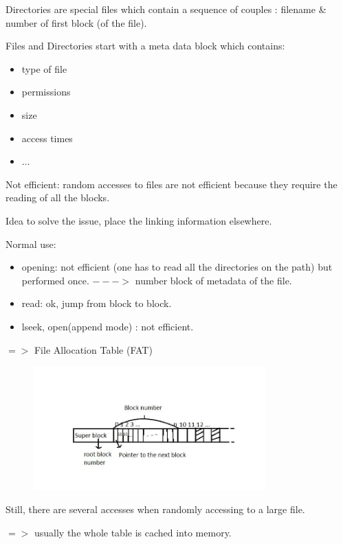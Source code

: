 Directories are special files which contain a sequence of couples : filename \& number of first block (of the file).

Files and Directories start with a meta data block which contains:
\begin{itemize}
  \item type of file
  \item permissions
  \item size
  \item access times
  \item ...
\end{itemize}

Not efficient: random accesses to files are not efficient because they require the reading of all the blocks.

Idea to solve the issue, place the linking information elsewhere.

Normal use:
\begin{itemize}
  \item opening: not efficient (one has to read all the directories on the path) but performed once. $--->$ number block of metadata of the file.
  \item read: ok, jump from block to block.
  \item lseek, open(append mode) :   not efficient.
\end{itemize}

$=>$ File Allocation Table (FAT)

 \begin{figure}[h!]
  \begin{center}
    \includegraphics[width=0.8\textwidth]{fat_2.jpg}
  \end{center}
\end{figure}

Still, there are several accesses when randomly accessing to a large file.

$=>$ usually the whole table is cached into memory.

